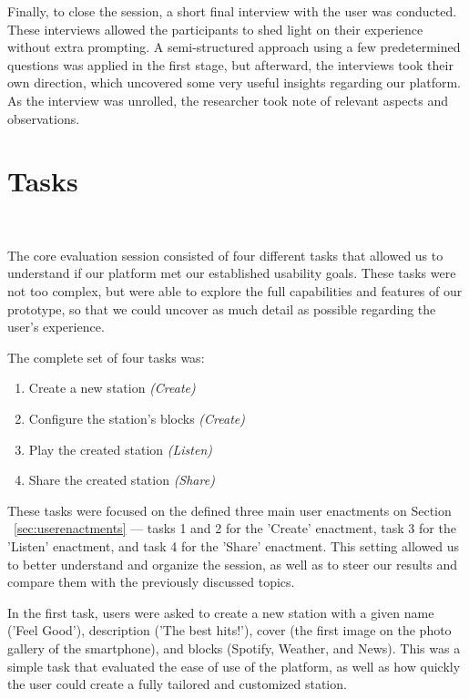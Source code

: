 Finally, to close the session, a short final interview with the user was conducted. These interviews allowed the participants to shed light on their experience without extra prompting. A semi-structured approach using a few predetermined questions was applied in the first stage, but afterward, the interviews took their own direction, which uncovered some very useful insights regarding our platform. As the interview was unrolled, the researcher took note of relevant aspects and observations.

\section{Tasks}
~\label{sub:tasks}

The core evaluation session consisted of four different tasks that allowed us to understand if our platform met our established usability goals. These tasks were not too complex, but were able to explore the full capabilities and features of our prototype, so that we could uncover as much detail as possible regarding the user's experience.

The complete set of four tasks was:

\begin{enumerate}
	\item Create a new station \textit{(Create)}
	\item Configure the station's blocks \textit{(Create)}
	\item Play the created station \textit{(Listen)}
	\item Share the created station \textit{(Share)}
\end{enumerate}

These tasks were focused on the defined three main user enactments on Section ~\ref{sec:userenactments} — tasks 1 and 2 for the 'Create' enactment, task 3 for the 'Listen' enactment, and task 4 for the 'Share' enactment. This setting allowed us to better understand and organize the session, as well as to steer our results and compare them with the previously discussed topics.

In the first task, users were asked to create a new station with a given name ('Feel Good'), description ('The best hits!'), cover (the first image on the photo gallery of the smartphone), and blocks (Spotify, Weather, and News). This was a simple task that evaluated the ease of use of the platform, as well as how quickly the user could create a fully tailored and customized station.

